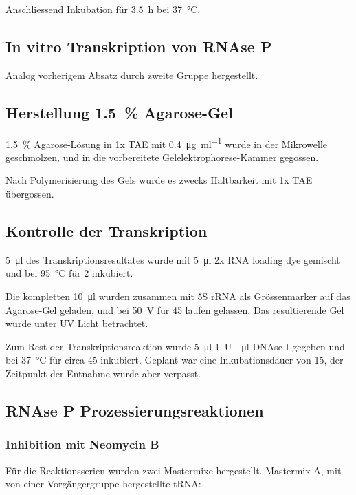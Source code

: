 \documentclass[a4paper,english]{scrreprt}
\begin{document}
Anschliessend Inkubation für \SI{3.5}{\hour} bei \SI{37}{\celsius}.

\subsection{In vitro Transkription von RNAse P}

Analog vorherigem Absatz durch zweite Gruppe hergestellt.

\subsection{Herstellung \SI{1.5}{\percent} Agarose-Gel}

\SI{1.5}{\percent} Agarose-Lösung in 1x TAE mit \SI{0.4}{\ug \per \ml}
 wurde in der Mikrowelle geschmolzen, und in die vorbereitete
Gelelektrophorese-Kammer gegossen.

Nach Polymerisierung des Gels wurde es zwecks Haltbarkeit mit 1x TAE
übergossen.

\subsection{Kontrolle der Transkription}

\SI{5}{\ul} des Transkriptionsresultates wurde mit \SI{5}{\ul} 2x RNA loading
dye gemischt und bei \SI{95}{\celsius} für \SI{2}{\min} inkubiert.

Die kompletten \SI{10}{\ul} wurden zusammen mit 5S rRNA als Grössenmarker auf
das Agarose-Gel geladen, und bei \SI{50}{\volt} für \SI{45}{\min} laufen
gelassen. Das resultierende Gel wurde unter UV Licht betrachtet.

Zum Rest der Transkriptionsreaktion wurde \SI{5}{\ul} \SI{1}{U \per \ul} DNAse
I gegeben und bei \SI{37}{\celsius} für circa \SI{45}{\min} inkubiert. Geplant war
eine Inkubationsdauer von \SI{15}{\min}, der Zeitpunkt der Entnahme wurde aber
verpasst.

\subsection{RNAse P Prozessierungsreaktionen}

\subsubsection{Inhibition mit Neomycin B}

Für die Reaktionsserien wurden zwei Mastermixe hergestellt. Mastermix A, mit
von einer Vorgängergruppe hergestellte tRNA:
\\
\end{document}
